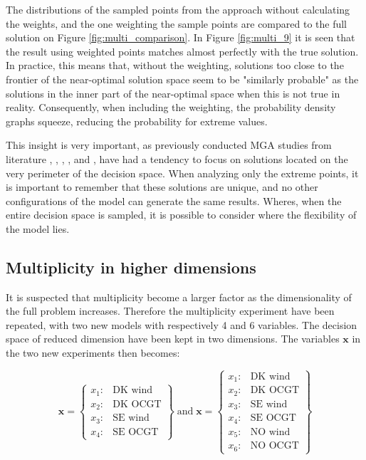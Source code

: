 The distributions of the sampled points from the approach without calculating the weights, and the one weighting the sample points are compared to the full solution on Figure \ref{fig:multi_comparison}. In Figure \ref{fig:multi_9} it is seen that the result using weighted points matches almost perfectly with the true solution. In practice, this means that, without the weighting, solutions too close to the frontier of the near-optimal solution space seem to be "similarly probable" as the solutions in the inner part of the near-optimal space when this is not true in reality. 
Consequently, when including the weighting, the probability density graphs squeeze, reducing the probability for extreme values. 


This insight is very important, as previously conducted MGA studies from literature \cite{DECAROLIS2016}, \cite{MGA_Price}, \cite{BERNTSEN2017886}, \cite{Yavuz2011}, \cite{Optimum_not_enough} and \cite{Fabian_MGA}, have had a tendency to focus on solutions located on the very perimeter of the decision space. When analyzing only the extreme points, it is important to remember that these solutions are unique, and no other configurations of the model can generate the same results. Wheres, when the entire decision space is sampled, it is possible to consider where the flexibility of the model lies. 

\subsection{Multiplicity in higher dimensions}

It is suspected that multiplicity become a larger factor as the dimensionality of the full problem increases. Therefore the multiplicity experiment have been repeated, with two new models with respectively 4 and 6 variables. The decision space of reduced dimension have been kept in two dimensions. The variables $\mathbf{x}$ in the two new experiments then becomes:

\begin{equation*}
\mathbf{x} = 
\begin{Bmatrix}
x_1:& \text{DK wind} \\
x_2:& \text{DK OCGT} \\
x_3:& \text{SE wind} \\
x_4:& \text{SE OCGT} 
\end{Bmatrix}
\; \text{and} \; 
\mathbf{x} = 
\begin{Bmatrix}
x_1:& \text{DK wind} \\
x_2:& \text{DK OCGT} \\
x_3:& \text{SE wind} \\
x_4:& \text{SE OCGT} \\
x_5:& \text{NO wind} \\
x_6:& \text{NO OCGT} 
\end{Bmatrix}
\end{equation*}


